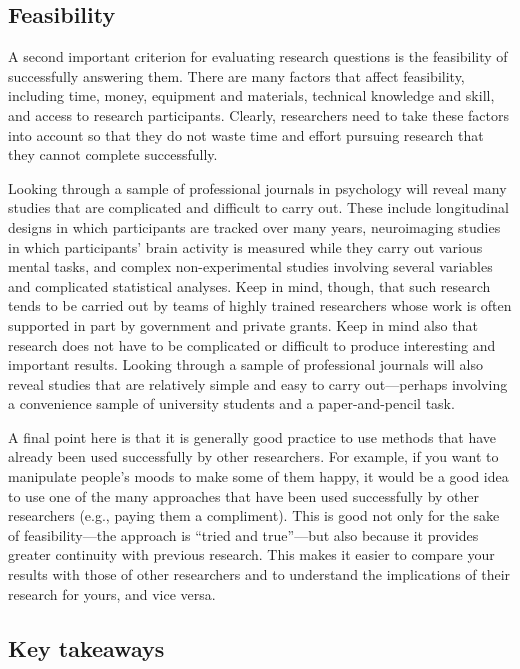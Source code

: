 \documentclass[]{book}
\theoremstyle{definition}
\theoremstyle{definition}
\theoremstyle{remark}
\begin{document}
\subsection{Feasibility}\label{feasibility}

A second important criterion for evaluating research questions is the
feasibility of successfully answering them. There are many factors that
affect feasibility, including time, money, equipment and materials,
technical knowledge and skill, and access to research participants.
Clearly, researchers need to take these factors into account so that
they do not waste time and effort pursuing research that they cannot
complete successfully.

Looking through a sample of professional journals in psychology will
reveal many studies that are complicated and difficult to carry out.
These include longitudinal designs in which participants are tracked
over many years, neuroimaging studies in which participants' brain
activity is measured while they carry out various mental tasks, and
complex non-experimental studies involving several variables and
complicated statistical analyses. Keep in mind, though, that such
research tends to be carried out by teams of highly trained researchers
whose work is often supported in part by government and private grants.
Keep in mind also that research does not have to be complicated or
difficult to produce interesting and important results. Looking through
a sample of professional journals will also reveal studies that are
relatively simple and easy to carry out---perhaps involving a
convenience sample of university students and a paper-and-pencil task.

A final point here is that it is generally good practice to use methods
that have already been used successfully by other researchers. For
example, if you want to manipulate people's moods to make some of them
happy, it would be a good idea to use one of the many approaches that
have been used successfully by other researchers (e.g., paying them a
compliment). This is good not only for the sake of feasibility---the
approach is ``tried and true''---but also because it provides greater
continuity with previous research. This makes it easier to compare your
results with those of other researchers and to understand the
implications of their research for yours, and vice versa.

\subsection{Key takeaways}\label{key-takeaways-5}
\end{document}
